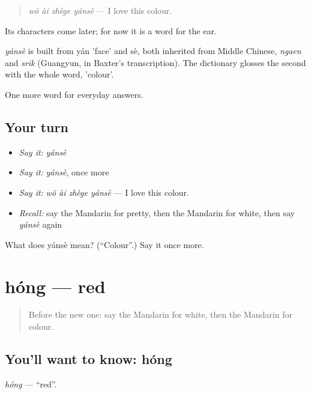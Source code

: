 \begin{quote}
\emph{wǒ ài zhège yánsè} — I love this colour.
\end{quote}

Its characters come later; for now it is a word for the ear.

\begin{cousinweb}
\emph{yánsè} is built from yán 'face' and sè, both inherited from Middle Chinese, \emph{ngaen} and \emph{srik} (Guangyun, in Baxter's transcription). The dictionary glosses the second with the whole word, 'colour'.
\end{cousinweb}

\begin{grammarlens}[title={What you've built}]
One more word for everyday answers.
\end{grammarlens}

\subsection*{Your turn}
\begin{itemize}
\raggedright
  \item \emph{Say it:} \emph{yánsè}
  \item \emph{Say it:} \emph{yánsè}, once more
  \item \emph{Say it:} \emph{wǒ ài zhège yánsè} — I love this colour.
  \item \emph{Recall:} say the Mandarin for pretty, then the Mandarin for white, then say \emph{yánsè} again
\end{itemize}

\begin{tcolorbox}[breakable,colback=teal!4,colframe=teal!35!black,title={Before you move on}]
What does yánsè mean? (\textquotedblleft{}Colour\textquotedblright{}.) Say it once more.
\end{tcolorbox}
\section[hóng]{hóng — red}

\label{lesson:ZH-C60-hong}



\begin{quote}
Before the new one: say the Mandarin for white, then the Mandarin for colour.
\end{quote}

\subsection*{You'll want to know: hóng}
\emph{hóng} — \textquotedblleft{}red\textquotedblright{}.

